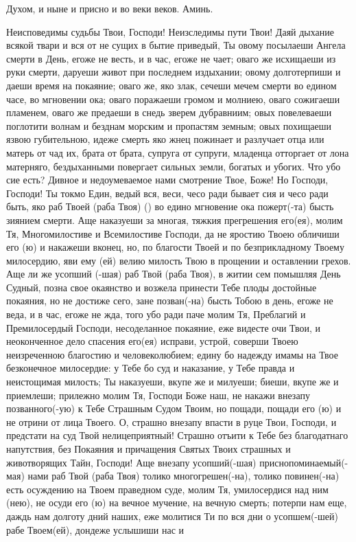 \begin{mymulticols}
Духом, и ныне и присно и во веки веков. Аминь. 

\end{mymulticols}

\mychapterending[1.5]{}


\begin{mymulticols}
 


Неисповедимы судьбы Твои, Господи! Неизследимы пути Твои! Даяй дыхание всякой твари и вся от не сущих в бытие приведый, Ты овому посылаеши Ангела смерти в День, егоже не весть, и в час, егоже не чает; оваго же исхищаеши из руки смерти, даруеши живот при последнем издыхании; овому долготерпиши и даеши время на покаяние; оваго же, яко злак, сечеши мечем смерти во едином часе, во мгновении ока; оваго поражаеши громом и молниею, оваго сожигаеши пламенем, оваго же предаеши в снедь зверем дубравниим; овых повелеваеши поглотити волнам и безднам морским и пропастям земным; овых похищаеши язвою губительною, идеже смерть яко жнец пожинает и разлучает отца или матерь от чад их, брата от брата, супруга от супруги, младенца отторгает от лона матерняго, бездыханными повергает сильных земли, богатых и убогих. Что убо сие есть? Дивное и недоумеваемое нами смотрение Твое, Боже! Но Господи, Господи! Ты токмо Един, ведый вся, веси, чесо ради бывает сия и чесо ради быть, яко раб Твоей (раба Твоя) () во едино мгновение ока пожерт(-та) бысть зиянием смерти. Аще наказуеши за многая, тяжкия прегрешения его(ея), молим Тя, Многомилостиве и Всемилостиве Господи, да не яростию Твоею обличиши его (ю) и накажеши вконец, но, по благости Твоей и по безприкладному Твоему милосердию, яви ему (ей) велию милость Твою в прощении и оставлении грехов. Аще ли же усопший (-шая) раб Твой (раба Твоя), в житии сем помышляя День Судный, позна свое окаянство и возжела принести Тебе плоды достойные покаяния, но не достиже сего, зане позван(-на) бысть Тобою в день, егоже не веда, и в час, егоже не жда, того убо ради паче молим Тя, Преблагий и Премилосердый Господи, несоделанное покаяние, еже видесте очи Твои, и неоконченное дело спасения его(ея) исправи, устрой, соверши Твоею неизреченною благостию и человеколюбием; едину бо надежду имамы на Твое безконечное милосердие: у Тебе бо суд и наказание, у Тебе правда и неистощимая милость; Ты наказуеши, вкупе же и милуеши; биеши, вкупе же и приемлеши; прилежно молим Тя, Господи Боже наш, не накажи внезапу позванного(-ую) к Тебе Страшным Судом Твоим, но пощади, пощади его (ю) и не отрини от лица Твоего. О, страшно внезапу впасти в руце Твои, Господи, и предстати на суд Твой нелицеприятный! Страшно отъити к Тебе без благодатнаго напутствия, без Покаяния и причащения Святых Твоих страшных и животворящих Тайн, Господи! Аще внезапу усопший(-шая) приснопоминаемый(-мая) нами раб Твой (раба Твоя) толико многогрешен(-на), толико повинен(-на) есть осуждению на Твоем праведном суде, молим Тя, умилосердися над ним (нею), не осуди его (ю) на вечное мучение, на вечную смерть; потерпи нам еще, даждь нам долготу дний наших, еже молитися Ти по вся дни о усопшем(-шей) рабе Твоем(ей), дондеже услышиши нас и 
\end{mymulticols}
